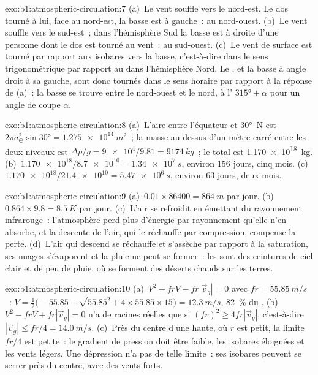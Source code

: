 \begin{solution}{exo:b1:atmospheric-circulation:7}
(a)~Le vent souffle vers le nord-est. Le dos tourné à lui, face au nord-est,
la basse est à gauche~: au nord-ouest. (b)~Le vent souffle vers le
sud-est~; dans l'hémisphère Sud la basse est à droite d'une personne dont le
dos est tourné au vent~: au sud-ouest. (c)~Le vent de surface est tourné par rapport aux
isobares vers la basse, c'est-à-dire dans le sens trigonométrique par rapport au  dans
l'hémisphère Nord. Le , et la basse à angle droit à sa gauche,
sont donc tournés dans le sens horaire par rapport à la réponse de (a)~: la basse se trouve entre
le nord-ouest et le nord, à l' $\ang{315} + \alpha$ pour un angle de coupe
$\alpha$.
\end{solution}

\begin{solution}{exo:b1:atmospheric-circulation:8}
(a)~L'aire entre l'équateur et \ang{30}~N est $2\pi a_\oplus^2\sin\ang{30} =
\qty{1.275e14}{m^2}$~; la masse au-dessus d'un mètre carré entre les deux niveaux est
$\Delta p/g = \num{9e4}/9.81 = \qty{9174}{kg}$~; le total est
\qty{1.170e18}{kg}. (b)~$\num{1.170e18}/\num{8.7e10} = \qty{1.34e7}{s}$, environ
\num{156} jours, cinq mois. (c)~$\num{1.170e18}/\num{21.4e10} = \qty{5.47e6}{s}$,
environ \num{63} jours, deux mois.
\end{solution}

\begin{solution}{exo:b1:atmospheric-circulation:9}
(a)~$\num{0.01} \times \num{86400} = \qty{864}{m}$ par jour. (b)~$0.864 \times 9.8 =
\qty{8.5}{K}$ par jour. (c)~L'air se refroidit en émettant du rayonnement infrarouge~:
l'atmosphère perd plus d'énergie par rayonnement qu'elle n'en absorbe, et la descente de
l'air, qui le réchauffe par compression, compense la perte. (d)~L'air qui descend se réchauffe et s'assèche
par rapport à la saturation, ses nuages s'évaporent et la pluie ne peut se former~: les  sont des ceintures de ciel clair et de peu de pluie, où se forment des déserts chauds sur les terres.
\end{solution}

\begin{solution}{exo:b1:atmospheric-circulation:10}
(a)~$V^2 + frV - fr|\vec v_g| = 0$ avec $fr = \qty{55.85}{m/s}$~:
$V = \tfrac12\bigl(-55.85 + \sqrt{55.85^2 + 4 \times 55.85 \times 15}\bigr) =
\qty{12.3}{m/s}$, \qty{82}{\percent} du . (b)~$V^2 - frV +
fr|\vec v_g| = 0$ n'a de racines réelles que si $(fr)^2 \geq 4fr|\vec v_g|$, c'est-à-dire
$|\vec v_g| \leq fr/4 = \qty{14.0}{m/s}$. (c)~Près du centre d'une haute, où $r$ est
petit, la limite $fr/4$ est petite~: le gradient de pression doit être faible, les isobares éloignées
et les vents légers. Une dépression n'a pas de telle limite~: ses isobares peuvent se serrer
près du centre, avec des vents forts.
\end{solution}


